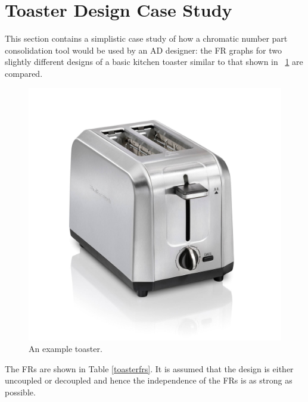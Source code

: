 \section{Toaster Design Case Study}

This section contains a simplistic case study of how a chromatic number part consolidation tool would be used by an
AD designer: the FR graphs for two slightly different designs of a basic kitchen toaster similar to that shown in
\figurename~\ref{fig:toaster} are compared.

\begin{figure}[H]
  \begin{center}
    \includegraphics[scale=0.2]{toaster}
  \end{center}
  \caption{An example toaster.}
  \label{fig:toaster}
\end{figure}

The FRs are shown in Table \ref{toasterfrs}.  It is assumed that the design is either uncoupled or decoupled and
hence the independence of the FRs is as strong as possible.

